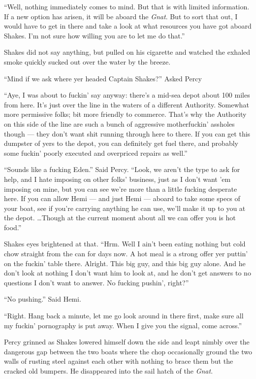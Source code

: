 \documentclass[]{scrbook}
\begin{document}
``Well, nothing immediately comes to mind. But that is with limited
information. If a new option has arisen, it will be aboard the
\emph{Gnat}. But to sort that out, I would have to get in there and take
a look at what resources you have got aboard Shakes. I'm not sure how
willing you are to let me do that.''

Shakes did not say anything, but pulled on his cigarette and watched the
exhaled smoke quickly sucked out over the water by the breeze.

``Mind if we ask where yer headed Captain Shakes?'' Asked Percy

``Aye, I was about to fuckin' say anyway: there's a mid-sea depot about
100 miles from here. It's just over the line in the waters of a
different Authority. Somewhat more permissive folks; bit more friendly
to commerce. That's why the Authority on this side of the line are such
a bunch of aggressive motherfuckin' assholes though --- they don't want
shit running through here to there. If you can get this dumpster of yers
to the depot, you can definitely get fuel there, and probably some
fuckin' poorly executed and overpriced repairs as well.''

``Sounds like a fucking Eden.'' Said Percy. ``Look, we aren't the type
to ask for help, and I hate imposing on other folks' business, just as I
don't want 'em imposing on mine, but you can see we're more than a
little fucking desperate here. If you can allow Hemi --- and just Hemi
--- aboard to take some specs of your boat, see if you're carrying
anything he can use, we'll make it up to you at the depot.
\ldots{}Though at the current moment about all we can offer you is hot
food.''

Shakes eyes brightened at that. ``Hrm. Well I ain't been eating nothing
but cold chow straight from the can for days now. A hot meal is a strong
offer yer puttin' on the fuckin' table there. Alright. This big guy, and
this big guy alone. And he don't look at nothing I don't want him to
look at, and he don't get answers to no questions I don't want to
answer. No fucking pushin', right?''

``No pushing.'' Said Hemi.

``Right. Hang back a minute, let me go look around in there first, make
sure all my fuckin' pornography is put away. When I give you the signal,
come across.''

Percy grinned as Shakes lowered himself down the side and leapt nimbly
over the dangerous gap between the two boats where the chop occasionally
ground the two walls of rusting steel against each other with nothing to
brace them but the cracked old bumpers. He disappeared into the sail
hatch of the \emph{Gnat}.
\end{document}
